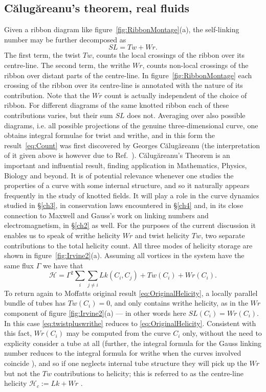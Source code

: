 \subsection{C\u{a}lug\u{a}reanu's theorem, real fluids}
Given a ribbon diagram like figure~\ref{fig:RibbonMontage}(a), the self-linking number may be further decomposed as
\begin{equation}
    SL = Tw + Wr.
    \label{eq:Count}
\end{equation}
The first term, the twist $Tw$, counts the local crossings of the ribbon over its centre-line. The second term, the writhe $Wr$, counts non-local crossings of the ribbon over distant parts of the centre-line. In figure~\ref{fig:RibbonMontage} each crossing of the ribbon over its centre-line is annotated with the nature of its contribution. Note that the $Wr$ count is actually independent of the choice of ribbon. For different diagrams of the same knotted ribbon each of these contributions varies, but their sum $SL$ does not. Averaging over also possible diagrams, i.e. all possible projections of the genuine three-dimensional curve, one obtains integral formulae for twist and writhe, and in this form the result~\eqref{eq:Count} was first discovered by Georges C\u{a}lug\u{a}reanu \citep{Calugareanu1959,Calugareanu1961} (the interpretation of it given above is however due to Ref.~\citep{Dennis2005}). C\u{a}lug\u{a}reanu's Theorem is an important and influential result, finding application in Mathematics, Physics, Biology and beyond. It is of potential relevance whenever one studies the properties of a curve with some internal structure, and so it naturally appears frequently in the study of knotted fields. It will play a role in the curve dynamics studied in \S\ref{ch3}, in conservation laws encountered in \S\ref{ch4} and, in its close connection to Maxwell and Gauss's work on linking numbers and electromagnetism, in \S\ref{ch2} as well. For the purposes of the current discussion it enables us to speak of writhe helicity $Wr$ and twist helicity $Tw$, two separate contributions to the total helicity count. All three modes of helicity storage are shown in figure~\ref{fig:Irvine2}(a). Assuming all vortices in the system have the same flux $\Gamma$ we have that
\begin{equation}
 \mathcal{H} = \Gamma^2\sum_i \sum_{j \neq i} Lk(C_i,C_j) + Tw(C_i) + Wr(C_i).\label{eq:twistpluswrithe} 
\end{equation}
To return again to Moffatts original result \eqref{eq:OriginalHelicity}, a locally parallel bundle of tubes has $Tw(C_i) =0$, and only contains writhe helicity, as in the $Wr$ component of figure \ref{fig:Irvine2}(a) --- in other words here $SL(C_i) = Wr(C_i)$. In this case \eqref{eq:twistpluswrithe} reduces to \eqref{eq:OriginalHelicity}. Consistent with this fact, $Wr(C_i)$ may be computed from the curve $C_i$ only, without the need to explicity consider a tube at all (further, the integral formula for the Gauss linking number reduces to the integral formula for writhe when the curves involved coincide \citep{Moffat1992}), and so if one neglects internal tube structure they will pick up the $Wr$ but not the $Tw$ contributions to helicity; this is referred to as the centre-line helicity $\mathcal{H}_c := Lk +Wr$ \citep{Scheeler2014}.

